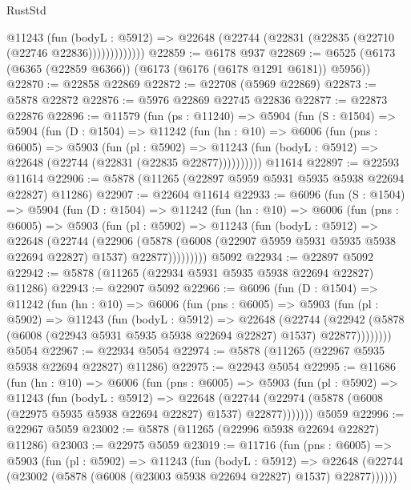 \begin{lexlean}{RustStd}
\begin{coremodule}
                @11243
                  (fun (bodyL : @5912) =>
                  @22648 (@22744 (@22831 (@22835 (@22710 (@22746 @22836)))))))))))))
@22859 := @6178 @937
@22869 := @6525 (@6173 (@6365 (@22859 @6366)) (@6173 (@6176 (@6178 @1291 @6181)) @5956))
@22870 := @22858 @22869
@22872 := @22708 (@5969 @22869)
@22873 := @5878 @22872
@22876 := @5976 @22869 @22745 @22836
@22877 := @22873 @22876
@22896 := @11579
    (fun (ps : @11240) =>
    @5904
      (fun (S : @1504) =>
      @5904
        (fun (D : @1504) =>
        @11242
          (fun (hn : @10) =>
          @6006
            (fun (pns : @6005) =>
            @5903
              (fun (pl : @5902) =>
              @11243 (fun (bodyL : @5912) => @22648 (@22744 (@22831 (@22835 @22877))))))))))
    @11614
@22897 := @22593 @11614
@22906 := @5878 (@11265 (@22897 @5959 @5931 @5935 @5938 @22694 @22827) @11286)
@22907 := @22604 @11614
@22933 := @6096
    (fun (S : @1504) =>
    @5904
      (fun (D : @1504) =>
      @11242
        (fun (hn : @10) =>
        @6006
          (fun (pns : @6005) =>
          @5903
            (fun (pl : @5902) =>
            @11243
              (fun (bodyL : @5912) =>
              @22648
                (@22744
                  (@22906
                    (@5878
                      (@6008 (@22907 @5959 @5931 @5935 @5938 @22694 @22827) @1537)
                      @22877)))))))))
    @5092
@22934 := @22897 @5092
@22942 := @5878 (@11265 (@22934 @5931 @5935 @5938 @22694 @22827) @11286)
@22943 := @22907 @5092
@22966 := @6096
    (fun (D : @1504) =>
    @11242
      (fun (hn : @10) =>
      @6006
        (fun (pns : @6005) =>
        @5903
          (fun (pl : @5902) =>
          @11243
            (fun (bodyL : @5912) =>
            @22648
              (@22744
                (@22942 (@5878 (@6008 (@22943 @5931 @5935 @5938 @22694 @22827) @1537) @22877))))))))
    @5054
@22967 := @22934 @5054
@22974 := @5878 (@11265 (@22967 @5935 @5938 @22694 @22827) @11286)
@22975 := @22943 @5054
@22995 := @11686
    (fun (hn : @10) =>
    @6006
      (fun (pns : @6005) =>
      @5903
        (fun (pl : @5902) =>
        @11243
          (fun (bodyL : @5912) =>
          @22648
            (@22744 (@22974 (@5878 (@6008 (@22975 @5935 @5938 @22694 @22827) @1537) @22877)))))))
    @5059
@22996 := @22967 @5059
@23002 := @5878 (@11265 (@22996 @5938 @22694 @22827) @11286)
@23003 := @22975 @5059
@23019 := @11716
    (fun (pns : @6005) =>
    @5903
      (fun (pl : @5902) =>
      @11243
        (fun (bodyL : @5912) =>
        @22648 (@22744 (@23002 (@5878 (@6008 (@23003 @5938 @22694 @22827) @1537) @22877))))))

\end{coremodule}
\end{lexlean}
